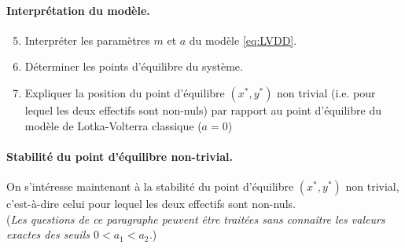 \paragraph{Interprétation du modèle.}
\begin{enumerate}
  \setcounter{enumi}{4}
  \item Interpréter les paramètres $m$ et $a$ du modèle \eqref{eq:LVDD}.
  \item Déterminer les points d'équilibre du système.
  \item Expliquer la position du point d'équilibre $(x^*, y^*)$ non trivial (i.e. pour lequel les deux effectifs sont non-nuls) par rapport au point d'équilibre du modèle de Lotka-Volterra classique ($a=0$)
\end{enumerate}

\bigskip
\bigskip
\paragraph{Stabilité du point d'équilibre non-trivial.}
On s'intéresse maintenant à la stabilité du point d'équilibre $(x^*, y^*)$ non trivial, c'est-à-dire celui pour lequel les deux effectifs sont non-nuls. \\
({\sl Les questions de ce paragraphe peuvent être traitées sans connaître les valeurs exactes des seuils $0 < a_1 < a_2$.})


